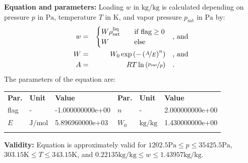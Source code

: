 \textbf{Equation and parameters:}
\newline
%
Loading $w$ in $\si{\kilogram\per\kilogram}$ is calculated depending on pressure $p$ in $\si{\pascal}$, temperature $T$ in $\si{\kelvin}$, and vapor pressure $p_\mathrm{sat}$ in $\si{\pascal}$ by:
%
\begin{equation*}
\begin{split}
w &=& \begin{cases} W \rho_\mathrm{sat}^{\mathrm{liq}} & \quad \text{if flag} \geq 0 \\ W & \quad \text{else} \end{cases} & \quad\text{, and} \\
W &=& W_0 \exp \left( - \left( \nicefrac{A}{E} \right) ^{n} \right) & \quad\text{, and} \\
A &=& R T \ln \left( \nicefrac{p_\mathrm{sat}}{p} \right) & \quad\text{.} \\
\end{split}
\end{equation*}
%
The parameters of the equation are:
%
\begin{longtable}[l]{lll|lll}
\toprule
\addlinespace
\textbf{Par.} & \textbf{Unit} & \textbf{Value} &	\textbf{Par.} & \textbf{Unit} & \textbf{Value} \\
\addlinespace
\midrule
\endhead

\bottomrule
\endfoot
\bottomrule
\endlastfoot
\addlinespace

flag & - & -1.000000000e+00 & $n$ & - & 2.000000000e+00 \\
$E$ & $\si{\joule\per\mole}$ & 5.896960000e+03 & $W_0$ & $\si{\kilogram\per\kilogram}$ & 1.430000000e+00 \\

\addlinespace\end{longtable}

\textbf{Validity:}
\newline
Equation is approximately valid for $1202.5 \si{\pascal} \leq p \leq 35425.5 \si{\pascal}$,  $303.15 \si{\kelvin} \leq T \leq 343.15 \si{\kelvin}$, and $0.22135 \si{\kilogram\per\kilogram} \leq w \leq 1.43957 \si{\kilogram\per\kilogram}$.
\newline

